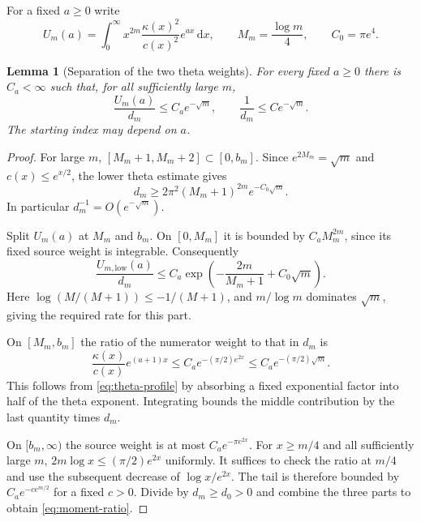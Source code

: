 \documentclass[11pt,a4paper]{article}
\newcommand{\dd}{\,\mathrm d}
\newtheorem{lemma}[theorem]{Lemma}
\theoremstyle{definition}
\theoremstyle{remark}
\numberwithin{equation}{section}
\begin{document}
For a fixed $a\ge0$ write
\begin{equation}\label{eq:U}
 U_m(a)=\int_0^\infty x^{2m}\frac{\kappa(x)^2}{c(x)^2}e^{ax}\dd x,
 \qquad M_m=\frac{\log m}{4},\qquad C_0=\pi e^4.
\end{equation}
\begin{lemma}[Separation of the two theta weights]\label{lem:moment-ratio}
For every fixed $a\ge0$ there is $C_a<\infty$ such that, for all
sufficiently large $m$,
\begin{equation}\label{eq:moment-ratio}
 \frac{U_m(a)}{d_m}\le C_a e^{-\sqrt m},\qquad
 \frac1{d_m}\le C e^{-\sqrt m}.
\end{equation}
The starting index may depend on $a$.
\end{lemma}
\begin{proof}
For large $m$, $[M_m+1,M_m+2]\subset[0,b_m]$. Since
$e^{2M_m}=\sqrt m$ and $c(x)\le e^{x/2}$, the lower theta estimate gives
\begin{equation}\label{eq:d-lower}
 d_m\ge2\pi^2(M_m+1)^{2m}e^{-C_0\sqrt m}.
\end{equation}
In particular $d_m^{-1}=O(e^{-\sqrt m})$.

Split $U_m(a)$ at $M_m$ and $b_m$. On $[0,M_m]$ it is bounded by
$C_a M_m^{2m}$, since its fixed source weight is integrable. Consequently
\begin{equation}\label{eq:ratio-low}
 \frac{U_{m,\mathrm{low}}(a)}{d_m}
 \le C_a\exp\left(-\frac{2m}{M_m+1}+C_0\sqrt m\right).
\end{equation}
Here $\log(M/(M+1))\le-1/(M+1)$, and $m/\log m$ dominates
$\sqrt m$, giving the required rate for this part.

On $[M_m,b_m]$ the ratio of the numerator weight to that in $d_m$ is
\begin{equation}\label{eq:ratio-mid}
 \frac{\kappa(x)}{c(x)}e^{(a+1)x}
 \le C_a e^{-(\pi/2)e^{2x}}
 \le C_a e^{-(\pi/2)\sqrt m}.
\end{equation}
This follows from \eqref{eq:theta-profile} by absorbing a fixed
exponential factor into half of the theta exponent. Integrating bounds
the middle contribution by the last quantity times $d_m$.

On $[b_m,\infty)$ the source weight is at most $C_a e^{-\pi e^{2x}}$.
For $x\ge m/4$ and all sufficiently large $m$,
$2m\log x\le(\pi/2)e^{2x}$ uniformly. It suffices to check the ratio
at $m/4$ and use the subsequent decrease of $\log x/e^{2x}$.
The tail is therefore bounded by $C_a e^{-c e^{m/2}}$ for a fixed $c>0$.
Divide by $d_m\ge d_0>0$ and combine the three parts to obtain
\eqref{eq:moment-ratio}.
\end{proof}
\end{document}
